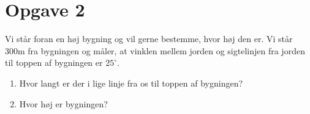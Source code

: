 


\section*{Opgave 2}
Vi står foran en høj bygning og vil gerne bestemme, hvor høj den er. Vi står 300m fra bygningen og måler, at vinklen mellem jorden og sigtelinjen fra jorden til toppen af bygningen er $25^\circ$.
\begin{enumerate}[label=\roman*)]
\item Hvor langt er der i lige linje fra os til toppen af bygningen?
\item Hvor høj er bygningen?
\end{enumerate}